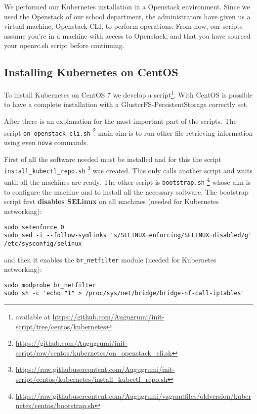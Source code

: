 We performed our Kubernetes installation in a Openstack environment.
Since we used the Openstack of our school department, the administrators have 
given us a virtual machine, Openstack-CLI, to perform operations. From now, our 
scripts assume you're in a machine with access to Openstack, and that you have 
sourced your openrc.sh script before continuing.

\subsection{Installing Kubernetes on CentOS}
\label{installing-kubernetes-on-centos}

To install Kubernetes on CentOS 7 we develop a script\footnote{available
at \url{https://github.com/Augugrumi/init-script/tree/centos/kubernetes}}.
With CentOS is possible to have a complete installation with
a GlusterFS-PersistentStorage correctly set.

After there is an explanation for the most important part of the scripts. The 
script \verb!on_openstack_cli.sh!
\footnote{\url{https://github.com/Augugrumi/init-script/raw/centos/kubernetes/on_openstack_cli.sh}}
main aim is to run other file retrieving information using even \texttt{nova} 
commands.

First of all the software needed must be installed and for this the script 
\\\verb!install_kubectl_repo.sh!
\footnote{\url{https://raw.githubusercontent.com/Augugrumi/init-script/centos/kubernetes/install_kubectl_repo.sh}}
was created. This only calls another script and waits until all the machines
are ready. The other script is \verb!bootstrap.sh!
\footnote{\url{https://raw.githubusercontent.com/Augugrumi/vagrantfiles/oldversion/kubernetes/centos/bootstrap.sh}}
whose aim is to configure the machine and to install all the necessary
software. The bootstrap script first \textbf{disables SELinux} on all machines 
(needed for Kubernetes networking):
\begin{lstlisting}
sudo setenforce 0
sudo sed -i --follow-symlinks 's/SELINUX=enforcing/SELINUX=disabled/g' /etc/sysconfig/selinux
\end{lstlisting}

and then it enables the \verb!br_netfilter! module (needed for Kubernetes
networking):
\begin{lstlisting}
sudo modprobe br_netfilter
sudo sh -c 'echo "1" > /proc/sys/net/bridge/bridge-nf-call-iptables'
\end{lstlisting}

